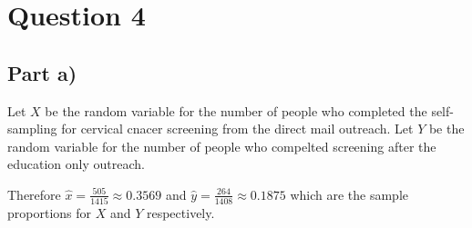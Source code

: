 \section{Question 4}

\subsection{Part a)}

Let $X$ be the random variable for the number of people who completed the self-sampling for cervical cnacer screening from the direct mail outreach.
Let $Y$ be the random variable for the number of people who compelted screening after the education only outreach.

Therefore $\hat{x} = \frac{505}{1415} \approx 0.3569$ and $\hat{y} = \frac{264}{1408} \approx 0.1875$ which are the sample proportions for $X$ and $Y$ respectively.
